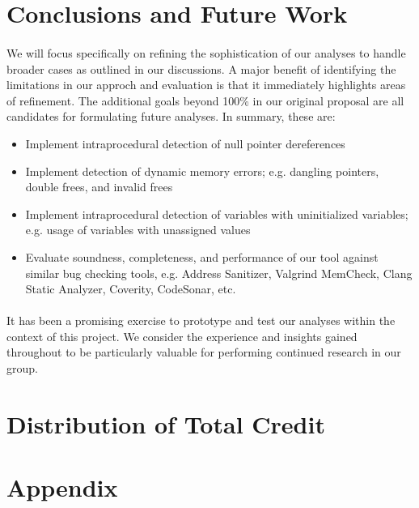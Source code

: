 \documentclass[letterpaper,11pt]{article}
\begin{document}
\section{Conclusions and Future Work}
\paragraph{}
We will focus specifically on refining the sophistication of our analyses
to handle broader cases as outlined in our discussions. A major benefit of
identifying the limitations in our approch and evaluation is that it
immediately highlights areas of refinement. The additional goals beyond 100\%
in our original proposal are all candidates for formulating future analyses.
In summary, these are:

\begin{itemize}
  \item Implement intraprocedural detection of null pointer dereferences
  \item  Implement detection of dynamic memory errors; e.g. dangling pointers,
double frees, and invalid frees
\item Implement intraprocedural detection of variables with uninitialized
variables; e.g. usage of variables with unassigned values
\item Evaluate soundness, completeness, and performance of our tool
  against similar bug checking tools, e.g. Address Sanitizer, Valgrind
  MemCheck, Clang Static Analyzer, Coverity, CodeSonar, etc.
\end{itemize}

\paragraph{} 
It has been a promising exercise to prototype and test our
analyses within the context of this project. We consider the experience and
insights gained throughout to be particularly valuable for performing continued
research in our group. 

\section{Distribution of Total Credit}

\clearpage

\appendix
\section{Appendix}
\label{appa1}
\end{document}
